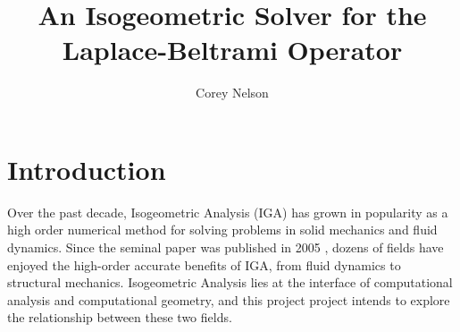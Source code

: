 \documentclass[preprint,1p,12pt]{elsarticle}
\begin{document}
\begin{frontmatter}



\title{An Isogeometric Solver for the Laplace-Beltrami Operator}


\author{Corey Nelson}





\end{frontmatter}


\section{Introduction}
Over the past decade, Isogeometric Analysis (IGA) has grown in popularity as a high order numerical method for solving problems in solid mechanics and fluid dynamics. Since the seminal paper was published in 2005 \cite{hughes_isogeometric_2005}, dozens of fields have enjoyed the high-order accurate benefits of IGA, from fluid dynamics to structural mechanics. Isogeometric Analysis lies at the interface of computational analysis and computational geometry, and this project project intends to explore the relationship between these two fields. 
\end{document}
